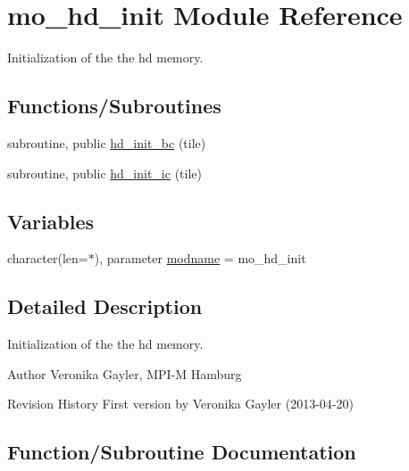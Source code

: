 \hypertarget{namespacemo__hd__init}{}\section{mo\+\_\+hd\+\_\+init Module Reference}
\label{namespacemo__hd__init}


Initialization of the the hd memory.  


\subsection*{Functions/\+Subroutines}
\begin{DoxyCompactItemize}
\item 
subroutine, public \hyperlink{namespacemo__hd__init_adf1d82e3e44ab86867243ede5e9d8a4c}{hd\+\_\+init\+\_\+bc} (tile)
\item 
subroutine, public \hyperlink{namespacemo__hd__init_a526043119739677fd2421c98d327096c}{hd\+\_\+init\+\_\+ic} (tile)
\end{DoxyCompactItemize}
\subsection*{Variables}
\begin{DoxyCompactItemize}
\item 
character(len=$\ast$), parameter \hyperlink{namespacemo__hd__init_a18c0a770451ae8f48a6785b1c570cf45}{modname} = \textquotesingle{}mo\+\_\+hd\+\_\+init\textquotesingle{}
\end{DoxyCompactItemize}


\subsection{Detailed Description}
Initialization of the the hd memory. 

\begin{DoxyAuthor}{Author}
Veronika Gayler, M\+P\+I-\/\+M Hamburg
\end{DoxyAuthor}
\begin{DoxyParagraph}{Revision History}
First version by Veronika Gayler (2013-\/04-\/20) 
\end{DoxyParagraph}


\subsection{Function/\+Subroutine Documentation}
\hypertarget{namespacemo__hd__init_adf1d82e3e44ab86867243ede5e9d8a4c}{}
